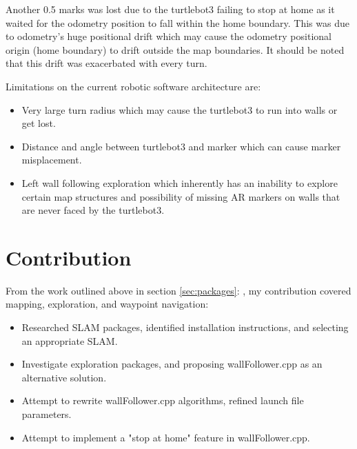 \documentclass[11pt, a4, nocenter, margin=150mm]{article}
\begin{document}
	Another 0.5 marks was lost due to the turtlebot3 failing to stop at home as it waited for the odometry position to fall within the home boundary. This was due to odometry's huge positional drift which may cause the odometry positional origin (home boundary) to drift outside the map boundaries. It should be noted that this drift was exacerbated with every turn.

	Limitations on the current robotic software architecture are:
	\begin{itemize}[noitemsep, nolistsep]
		\item Very large turn radius which may cause the turtlebot3 to run into walls or get lost.
		\item Distance and angle between turtlebot3 and marker which can cause marker misplacement.
		\item Left wall following exploration which inherently has an inability to explore certain map structures and possibility of missing AR markers on walls that are never faced by the turtlebot3.
	\end{itemize}

\section{Contribution}
\label{sec:contribution}

	From the work outlined above in section \ref{sec:packages}: , my contribution covered mapping, exploration, and waypoint navigation:
	\begin{itemize}[noitemsep, nolistsep]
		\item Researched SLAM packages, identified installation instructions, and selecting an appropriate SLAM.
		\item Investigate exploration packages, and proposing wallFollower.cpp as an alternative solution.
		\item Attempt to rewrite wallFollower.cpp algorithms, refined launch file parameters.
		\item Attempt to implement a "stop at home" feature in wallFollower.cpp.
	\end{itemize}

\pagebreak
\end{document}
